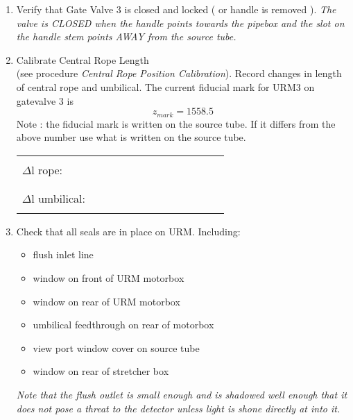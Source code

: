 \begin{enumerate}
  
\item\checkbox Verify that Gate Valve 3 is closed and locked ( or handle is removed ).
   \small
   {\em
     The valve is CLOSED when the handle points towards the pipebox and the slot
      on the handle stem points AWAY from the source tube.
   }
   \normalsize


\item \checkbox Calibrate Central Rope Length\\
      (see procedure  
       {\em Central Rope Position Calibration}).
      Record changes in length of central rope and umbilical.
       The current fiducial mark for URM3 on gatevalve 3 is 
   \[
         z_{mark} = 1558.5 
       \]
       Note : the fiducial mark is written on the source tube. If it
       differs from the above number use what is written on the source tube.

     \begin{center}
     \begin{tabular}{|l|}
     \hline
      \\
     $\Delta$l rope:~~~~~~~~~~~~~~~~~~~~~~~~\\
      \\
     \hline
      \\
     $\Delta$l umbilical:~~~~~~~~~~~~~~~~~~~~~~~~\\
      \\
     \hline
     \end{tabular}
     \end{center}

 
\item \checkbox Check that all seals are in place on URM.  Including:
   \begin{itemize}
      \item\checkbox flush inlet line
      \item\checkbox window on front of URM  motorbox
      \item\checkbox window on rear of URM motorbox
      \item\checkbox umbilical feedthrough on rear of motorbox
      \item\checkbox view port window cover on source tube
       \item\checkbox window on rear of stretcher box
   \end{itemize}
\small
{ \em
 Note that the flush outlet is small enough and is shadowed well enough that it does not
pose a threat to the detector unless light is shone directly at into it. 


} 

\normalsize

\end{enumerate}



